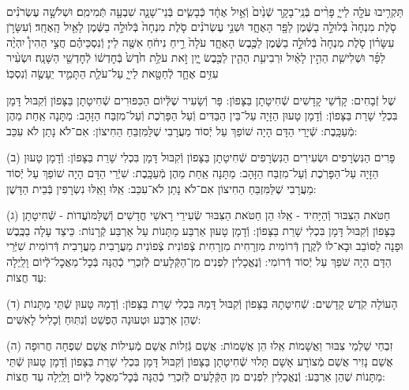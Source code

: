 \documentclass[twoside, openany, parskip=half, 11pt]{book}
\begin{document}
\\
תַּקְרִ֥יבוּ עֹלָ֖ה לַייָ֑ פָּרִ֨ים בְּֿנֵֽי־בָקָ֤ר שְֿׁנַ֙יִם֙ וְֿאַ֣יִל אֶחָ֔ד כְּֿבָשִׂ֧ים בְּֿנֵי־שָׁנָ֛ה שִׁבְעָ֖ה תְּֿמִימִֽם׃
וּשְׁלֹשָׁ֣ה עֶשְׂרֹנִ֗ים סֹ֤לֶת מִנְחָה֙ בְּֿלוּלָ֣ה בַשֶּׁ֔מֶן לַפָּ֖ר הָאֶחָ֑ד וּשְׁנֵ֣י עֶשְׂרֹנִ֗ים סֹ֤לֶת מִנְחָה֙ בְּֿלוּלָ֣ה בַשֶּׁ֔מֶן לָאַ֖יִל הָֽאֶחָֽד׃
וְֿעִשָּׂרֹ֣ן עִשָּׂר֗וֹן סֹ֤לֶת מִנְחָה֙ בְּֿלוּלָ֣ה בַשֶּׁ֔מֶן לַכֶּ֖בֶשׂ הָאֶחָ֑ד עֹלָה֙ רֵ֣יחַ נִיחֹ֔חַ אִשֶּׁ֖ה לַייָ׃
וְֿנִסְכֵּיהֶ֗ם חֲצִ֣י הַהִין֩ יִהְיֶ֨ה לַפָּ֜ר וּשְׁלִישִׁ֧ת הַהִ֣ין לָאַ֗יִל וּרְבִיעִ֥ת הַהִ֛ין לַכֶּ֖בֶשׂ יָ֑יִן זֹ֣את עֹלַ֥ת חֹ֙דֶשׁ֙ בְּֿחׇדְשׁ֔וֹ לְֿחׇדְשֵׁ֖י הַשָּׁנָֽה׃
וּשְׂעִ֨יר עִזִּ֥ים אֶחָ֛ד לְֿחַטָּ֖את לַייָ֑ עַל־עֹלַ֧ת הַתָּמִ֛יד יֵעָשֶׂ֖ה וְֿנִסְכּֽוֹ׃

%
שֶׁל זְֿבָחִים: קָדְֿשֵׁי קָדָשִׁים שְֿׁחִיטָתָן בַּצָּפוֹן: פָּר וְֿשָׂעִיר שֶׁלְּֿיוֹם הַכִּפּוּרִים שְֿׁחִיטָתָן בַּצָּפוֹן וְֿקִבּוּל דָּמָן בִּכְלֵי שָׁרֵת בַּצָּפוֹן: וְֿדָמָן טָעוּן הַזָּיָה עַל־בֵּין הַבַּדִּים וְֿעַל הַפָּרֹֽכֶת וְֿעַל־מִזְבַּח הַזָּהָב: מַתָּנָה אַֽחַת מֵהֶן מְֿעַכָּֽבֶת: שְֿׁיָרֵי הַדָּם הָיָה שׁוֹפֵךְ עַל יְֿסוֹד מַעֲרָבִי שֶׁלַּמִּזְבֵּחַ הַחִיצוֹן: אִם־לֹא נָתַן לֹא עִכֵּב:

(ב) פָּרִים הַנִּשְׂרָפִים וּשְׂעִירִים הַנִּשְׂרָפִים שְֿׁחִיטָתָן בַּצָּפוֹן וְֿקִבּוּל דָּמָן בִּכְלִי שָׁרֵת בַּצָּפוֹן: וְֿדָמָן טָעוּן הַזָּיָה עַל־הַפָּרֹֽכֶת וְֿעַל־מִזְבַּח הַזָּהָב: מַתָּנָה אַֽחַת מֵהֶן מְֿעַכָּֽבֶת: שִׁיְֿרֵי הַדָּם הָיָה שׁוֹפֵךְ עַל יְֿסוֹד מַעֲרָבִי שֶׁלַּמִּזְבֵּחַ הַחִיצוֹן אִם־לֹא נָתַן לֹא־עִכֵּב: אֵֽלּוּ וָאֵֽלּוּ נִשְׂרָפִין בְּֿבֵית הַדָּשֶׁן:

(ג) חַטֹּאת הַצִּבּוּר וְֿהַיָּחִיד - אֵֽלּוּ הֵן חַטֹּאת הַצִּבּוּר שְֿׂעִירֵי רָאשֵׁי חֳדָשִׁים וְֿשֶׁלַּמּוׁעֲדוׂת - שְֿׁחִיטָתָן בַּצָּפוֹן וְֿקִבּוּל דָּמָן בִּכְלִי שָׁרֵת בַּצָּפוֹן: וְֿדָמָן טָעוּן אַרְבַּע מַתָּנוֹת עַל אַרְבַּע קְֿרָנוֹת: כֵּיצַד עָלָה בַכֶּֽבֶשׁ וּפָנָה לַסּוֹבֵב וּבָא־לוֹ לְֿקֶֽרֶן דְּֿרוֹמִית מִזְרָחִית מִזְרָחִית צְֿפוֹנִית צְֿפוֹנִית מַעֲרָבִית מַעֲרָבִית דְּֿרוֹמִית שִׁיְּֿרֵי הַדָּם הָיָה שֹׁפֵךְ עַל יְֿסוֹד דְּֿרוֹמִי: וְֿנֶאֱכָלִין לִפְנִים מִן־הַקְּֿלָעִים לְֿזִכְרֵי כְֿהֻנָּה בְּֿכׇל־מַאֲכׇל־לְֿיוֹם וָלַֽיְלָה עַד חֲצוֹת:

(ד) הָעוֹלָה קֹֽדֶשׁ קָדָשִׁים: שְֿׁחִיטָתָהּ בַּצָּפוֹן וְֿקִבּוּל דָּמָהּ בִּכְלִי שָׁרֵת בַּצָּפוֹן: וְֿדָמָהּ טָעוּן שְֿׁתֵּי מַתָּנוֹת שֶׁהֵן אַרְבַּע וּטְעוּנָה הֶפְשֵׁט וְֿנִתּֽוּחַ וְֿכָלִיל לָאִשִּׁים:

(ה) זִבְחֵי שַׁלְמֵי צִבּוּר וַאֲשָׁמוֹת אֵֽלוּ הֵן אֲשָׁמוֹת: אֲשַׁם גְּֿזֵלוֹת אֲשַׁם מְֿעִילוֹת אֲשַׁם שִׁפְחָה חֲרוּפָה אֲשַׁם נָזִיר אֲשַׁם מְֿצוֹרָע אָשָׁם תָּלוּי שְֿׁחִיטָתָן בַּצָּפוֹן וְֿקִבּוּל דָּמָן בִּכְלִי שָׁרֵת בַּצָּפוֹן וְֿדָמָן טָעוּן שְֿׁתֵּי מַתָּנוֹת שֶׁהֵן אַרְבַּע: וְֿנֶאֱכָלִין לִפְנִים מִן הַקְּֿלָעִים לְֿזִכְרֵי כְֿהֻנָּה בְּֿכׇל־מַאֲכׇל לְֿיוֹם וָלַֽיְלָה עַד חֲצוֹת:
\end{document}
